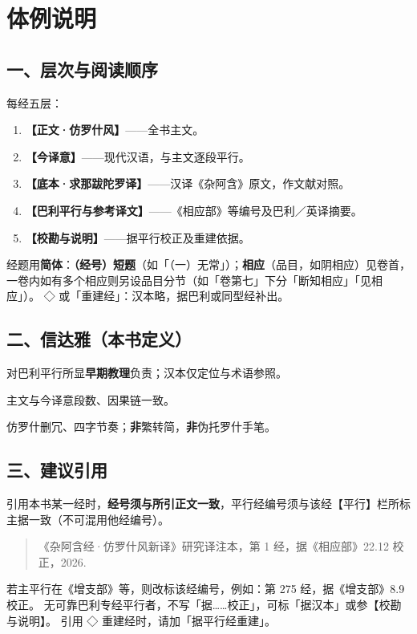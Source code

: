 
\chapter*{体例说明}

\section*{一、层次与阅读顺序}

每经五层：

\begin{enumerate}[label=\textbf{\arabic*.}]
  \item \textbf{【正文·仿罗什风】}——全书主文。
  \item \textbf{【今译意】}——现代汉语，与主文逐段平行。
  \item \textbf{【底本·求那跋陀罗译】}——汉译《杂阿含》原文，作文献对照。
  \item \textbf{【巴利平行与参考译文】}——《相应部》等编号及巴利／英译摘要。
  \item \textbf{【校勘与说明】}——据平行校正及重建依据。
\end{enumerate}

经题用\textbf{简体}：\textbf{（经号）短题}（如「（一）无常」）；\textbf{相应}（品目，如阴相应）见卷首，
一卷内如有多个相应则另设品目分节（如「卷第七」下分「断知相应」「见相应」）。
◇ 或「重建经」：汉本略，据巴利或同型经补出。

\section*{二、信达雅（本书定义）}

\begin{description}[style=nextline,leftmargin=3em]
  \item[信] 对巴利平行所显\textbf{早期教理}负责；汉本仅定位与术语参照。
  \item[达] 主文与今译意段数、因果链一致。
  \item[雅] 仿罗什删冗、四字节奏；\textbf{非}繁转简，\textbf{非}伪托罗什手笔。
\end{description}

\section*{三、建议引用}

引用本书某一经时，\textbf{经号须与所引正文一致}，平行经编号须与该经【平行】栏所标主据一致（不可混用他经编号）。

\begin{quote}\small
《杂阿含经·仿罗什风新译》研究译注本，第 1 经，据《相应部》22.12 校正，2026.
\end{quote}

\noindent 若主平行在《增支部》等，则改标该经编号，例如：第 275 经，据《增支部》8.9 校正。
无可靠巴利专经平行者，不写「据……校正」，可标「据汉本」或参【校勘与说明】。
引用 ◇ 重建经时，请加「据平行经重建」。

\clearpage
